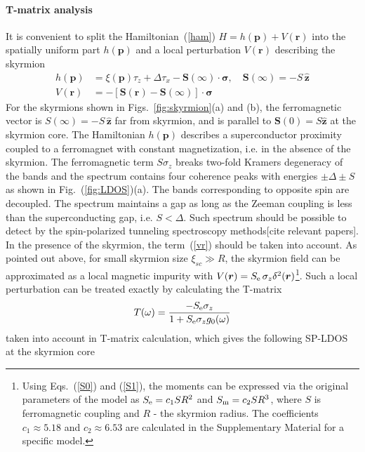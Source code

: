 \documentclass[twocolumn,showpacs,floatfix,nofootinbib,longbibliography]{revtex4-1}
\begin{document}
\paragraph*{T-matrix analysis} \label{sec:analytics}
It is convenient to split the Hamiltonian~(\ref{ham}) $H = h(\bm p)+V(\bm r)$ into the spatially uniform part $h(\bm p)$ and a local perturbation $V(\bm r)$ describing the skyrmion
\begin{align}
	h(\bm p) & =  \xi(\bm p)\tau_z+\Delta \tau_x - \bm S(\infty)\cdot\bm\sigma,\quad \bm S(\infty) = -S\,\hat{\bm z}\\
	V(\bm r) & =  - \left[\bm S(\bm r)-\bm S(\infty)\right]\cdot\bm\sigma  \label{vr}
\end{align}
For the skyrmions shown in Figs.~\ref{fig:skyrmion}(a) and (b), the ferromagnetic vector is $S(\infty) = -S\,\hat{\bm z}$ far from skyrmion, and is parallel to $\bm S(0)= S\hat{\bm z}$ at the skyrmion core. The Hamiltonian $h(\bm p)$ describes a superconductor proximity coupled to a ferromagnet with constant magnetization, i.e. in the absence of the skyrmion. The ferromagnetic term $S\sigma_z$ breaks two-fold Kramers degeneracy of the bands and the spectrum contains four coherence peaks with energies $\pm\Delta\pm S$ as shown in Fig.~(\ref{fig:LDOS})(a). The bands corresponding to opposite spin are decoupled. The spectrum maintains a gap as long as the Zeeman coupling is less than the superconducting gap, i.e. $S<\Delta$. Such spectrum should be possible to detect by the spin-polarized tunneling spectroscopy methods[cite relevant papers]. In the presence of the skyrmion, the term~(\ref{vr}) should be taken into account. As pointed out above, for small skyrmion size $\xi_{sc}\gg R$, the skyrmion field can be approximated as a local magnetic impurity with $V(\bm r)=S_{\rm e}\,\sigma_z \delta^2(\bm r)$\footnote{Using Eqs.~(\ref{S0}) and (\ref{S1}), the moments can be expressed via the original parameters of the model as $S_{\rm e} = c_1 S R^2$ and $S_{\rm m} = c_2 S R^3$, where $S$ is ferromagnetic coupling and $R$ - the skyrmion radius. The coefficients $c_1\approx 5.18$ and $c_2\approx 6.53$ are calculated in the Supplementary Material for a specific model. }. Such a local perturbation can be  treated exactly by calculating the T-matrix
\begin{align}
	T(\omega) =   \frac{-S_{\rm e}\sigma_z}{1+S_{\rm e}\sigma_zg_{0}(\omega)} \label{tm} 
\end{align}
taken into account in T-matrix calculation, which gives the following SP-LDOS at the skyrmion core
\end{document}

